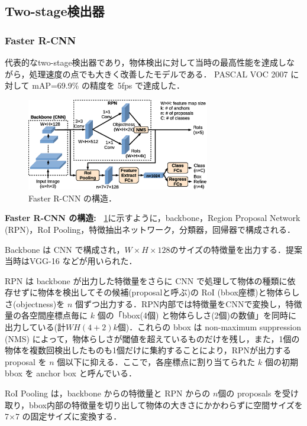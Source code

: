 \documentclass[originalpaper,fleqn]{jsaiart}     %
\begin{document}
\subsection{Two-stage検出器}
\subsubsection{Faster R-CNN}
代表的なtwo-stage検出器であり，物体検出に対して当時の最高性能を達成しながら，処理速度の点でも大きく改善したモデルである\cite{RHGS15}．
PASCAL VOC 2007 に対して mAP=69.9\% の精度を 5fps で達成した．
\begin{figure}[tb]
    \begin{center}
        \includegraphics[width=8cm,clip]{fig/archi_FasterRCNN.eps}
    \end{center}
    \caption{ Faster R-CNN の構造．}
    \label{fig:archi_FasterRCNN}
\end{figure}

{\bf Faster R-CNN の構造:\ } \ref{fig:archi_FasterRCNN}に示すように，backbone，Region Proposal Network (RPN)，RoI Pooling，特徴抽出ネットワーク，分類器，回帰器で構成される．

Backbone は CNN で構成され，$W{\times}H{\times}128$のサイズの特徴量を出力する．提案当時はVGG-16 \cite{SimZis15}などが用いられた．

RPN は backbone が出力した特徴量をさらに CNN で処理して物体の種類に依存せずに物体を検出してその候補(proposalと呼ぶ)の RoI (bbox座標)と物体らしさ(objectness)を $n$ 個ずつ出力する．RPN内部では特徴量をCNNで変換し，特徴量の各空間座標点毎に $k$ 個の「bbox(4個) と物体らしさ(2個)の数値」を同時に出力している(計$WH(4{+}2)k$個)．これらの bbox は non-maximum suppression (NMS) によって，物体らしさが閾値を超えているものだけを残し，また，1個の物体を複数回検出したものも1個だけに集約することにより，RPNが出力するproposal を $n$ 個以下に抑える．ここで，各座標点に割り当てられた $k$ 個の初期 bbox を anchor box と呼んでいる．

RoI Pooling は，backbone からの特徴量と RPN からの $n$個の proposals を受け取り，bbox内部の特徴量を切り出して物体の大きさにかかわらずに空間サイズを 7{$\times$}7 の固定サイズに変換する．
\end{document}
